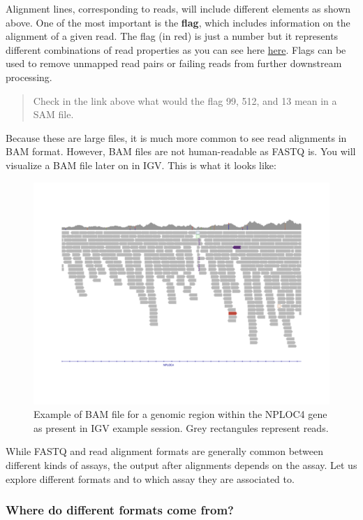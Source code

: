 \documentclass[
]{book}
\begin{document}
Alignment lines, corresponding to reads, will include different elements as shown above. One of the most important is the \textbf{flag}, which includes information on the alignment of a given read. The flag (in red) is just a number but it represents different combinations of read properties as you can see here \href{https://broadinstitute.github.io/picard/explain-flags.html}{here}. Flags can be used to remove unmapped read pairs or failing reads from further downstream processing.

\begin{quote}
Check in the link above what would the flag 99, 512, and 13 mean in a SAM file.
\end{quote}

Because these are large files, it is much more common to see read alignments in BAM format. However, BAM files are not human-readable as FASTQ is. You will visualize a BAM file later on in IGV. This is what it looks like:

\begin{figure}
\centering
\includegraphics{figures/bamexample.png}
\caption{Example of BAM file for a genomic region within the NPLOC4 gene as present in IGV example session. Grey rectangules represent reads.}
\end{figure}

While FASTQ and read alignment formats are generally common between different kinds of assays, the output after alignments depends on the assay. Let us explore different formats and to which assay they are associated to.

\hypertarget{where-do-different-formats-come-from}{%
\subsubsection{Where do different formats come from?}\label{where-do-different-formats-come-from}}
\end{document}
